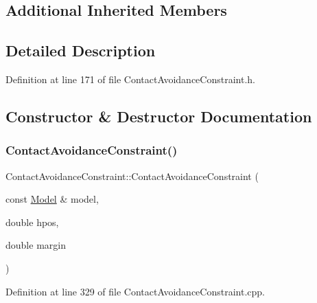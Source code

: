 \subsection*{Additional Inherited Members}


\subsection{Detailed Description}


Definition at line 171 of file Contact\+Avoidance\+Constraint.\+h.



\subsection{Constructor \& Destructor Documentation}
\hypertarget{classocra_1_1ContactAvoidanceConstraint_a77ef6f814bddd8ff8eabb9cf1272b4a3}{}\label{classocra_1_1ContactAvoidanceConstraint_a77ef6f814bddd8ff8eabb9cf1272b4a3} 
\subsubsection{\texorpdfstring{Contact\+Avoidance\+Constraint()}{ContactAvoidanceConstraint()}}
{\footnotesize\ttfamily Contact\+Avoidance\+Constraint\+::\+Contact\+Avoidance\+Constraint (\begin{DoxyParamCaption}\item[{const \hyperlink{classocra_1_1Model}{Model} \&}]{model,  }\item[{double}]{hpos,  }\item[{double}]{margin }\end{DoxyParamCaption})}



Definition at line 329 of file Contact\+Avoidance\+Constraint.\+cpp.

\hypertarget{classocra_1_1ContactAvoidanceConstraint_a57650df61143b936321c20d582f2457f}{}\label{classocra_1_1ContactAvoidanceConstraint_a57650df61143b936321c20d582f2457f} 
